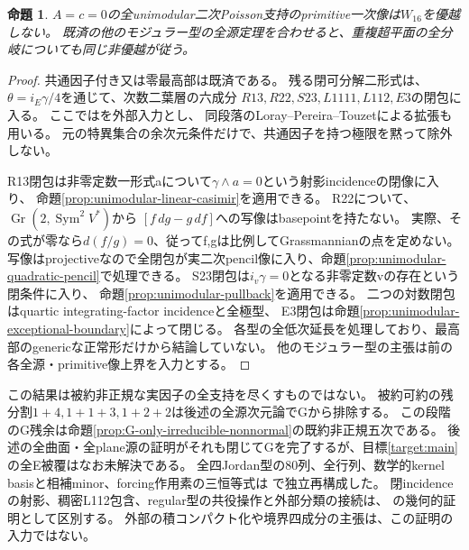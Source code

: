 \documentclass[a4paper,11pt]{ltjsarticle}
\newtheorem{proposition}{命題}[section]
\theoremstyle{definition}
\begin{document}
\begin{proposition}\label{prop:all-unimodular-nondominance}
$A=c=0$の全unimodular二次Poisson支持のprimitive一次像は$W_{16}$を優越しない。
既済の他のモジュラー型の全源定理を合わせると、重複超平面の全分岐についても同じ非優越が従う。
\end{proposition}
\begin{proof}
共通因子付き又は零最高部は既済である。
残る閉可分解二形式は、$\theta=i_E\gamma/4$を通じて、次数二葉層の六成分
$R13,R22,S23,L1111,L112,E3$の閉包に入る。
ここでは\cite[Theorem 3.1及び直後の段落]{pymquantum}を外部入力とし、
同段落のLoray--Pereira--Touzetによる拡張も用いる。
元の特異集合の余次元条件だけで、共通因子を持つ極限を黙って除外しない。

R13閉包は非零定数一形式aについて$\gamma\wedge a=0$という射影incidenceの閉像に入り、
命題\ref{prop:unimodular-linear-casimir}を適用できる。
R22について、$\operatorname{Gr}(2,\operatorname{Sym}^2V^*)$から
$[f\,dg-g\,df]$への写像はbasepointを持たない。
実際、その式が零なら$d(f/g)=0$、従ってf,gは比例してGrassmannianの点を定めない。
写像はprojectiveなので全閉包が実二次pencil像に入り、命題\ref{prop:unimodular-quadratic-pencil}で処理できる。
S23閉包は$i_v\gamma=0$となる非零定数vの存在という閉条件に入り、
命題\ref{prop:unimodular-pullback}を適用できる。
二つの対数閉包はquartic integrating-factor incidenceと全極型、
E3閉包は命題\ref{prop:unimodular-exceptional-boundary}によって閉じる。
各型の全低次延長を処理しており、最高部のgenericな正常形だけから結論していない。
他のモジュラー型の主張は前の各全源・primitive像上界を入力とする。
\end{proof}
この結果は被約非正規な実因子の全支持を尽くすものではない。
被約可約の残分割$1+4,1+1+3,1+2+2$は後述の全源次元論でGから排除する。
この段階のG残余は命題\ref{prop:G-only-irreducible-nonnormal}の既約非正規五次である。
後述の全曲面・全plane源の証明がそれも閉じてGを完了するが、目標\ref{target:main}の全E被覆はなお未解決である。
全四Jordan型の80列、全行列、数学的kernel basisと相補minor、forcing作用素の三恒等式は
で独立再構成した。
閉incidenceの射影、稠密L112包含、regular型の共役操作と外部分類の接続は、
の幾何的証明として区別する。
外部の積コンパクト化や境界四成分の主張は、この証明の入力ではない。
\end{document}

